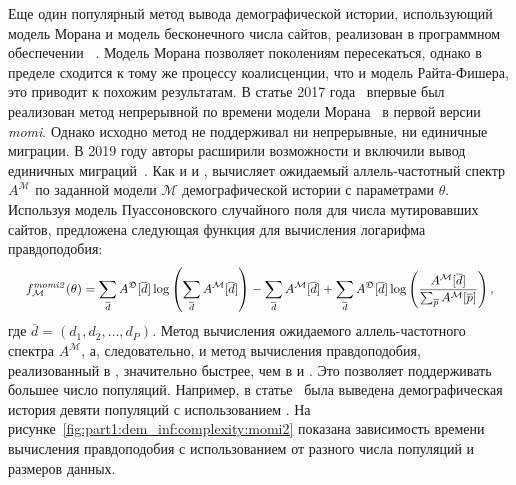 Еще один популярный метод вывода демографической истории, использующий модель Морана и модель бесконечного числа сайтов, реализован в программном обеспечении \momi~\cite{kamm2020efficiently}.
Модель Морана позволяет поколениям пересекаться, однако в пределе сходится к тому же процессу коалисценции, что и модель Райта-Фишера, это приводит к похожим результатам.
В статье 2017 года~\cite{kamm2017efficient} впервые был реализован метод непрерывной по времени модели Морана~\cite{durrett2008probability} в первой версии \textit{momi}.
Однако исходно метод не поддерживал ни непрерывные, ни единичные миграции.
В 2019 году авторы расширили возможности и включили вывод единичных миграций~\cite{kamm2020efficiently}.
Как и \dadi и \moments, \momi вычисляет ожидаемый аллель-частотный спектр $A^\mathcal{M}$ по заданной модели $\mathcal{M}$ демографической истории с параметрами $\theta$.
Используя модель Пуассоновского случайного поля для числа мутировавших сайтов, предложена следующая функция для вычисления логарифма правдоподобия:
$$
\scalemath{0.9}{
f^{\text{\momi}}_\mathcal{M}(\theta) = \sum_{\overline{d}} A^\mathfrak{D}[\overline{d}] \log \left(\sum_{\overline{d}} A^{\mathcal{M}}[\overline{d}]\right) - \sum_{\overline{d}} A^{\mathcal{M}}[\overline{d}] + \sum_{\overline{d}} A^{\mathfrak{D}}[\overline{d}] \log \left(\frac{A^{\mathcal{M}}[\overline{d}]}{\sum_{\overline{p}} A^{\mathcal{M}}[\overline{p}]}\right),
}
$$
где $\overline{d} = (d_1, d_2, \dots, d_P)$.
Метод вычисления ожидаемого аллель-частотного спектра $A^\mathcal{M}$, а, следовательно, и метод вычисления правдоподобия, реализованный в \momi, значительно быстрее, чем в \dadi и \moments.
Это позволяет поддерживать большее число популяций.
Например, в статье~\cite{kamm2020efficiently} была выведена демографическая история девяти популяций с использованием \momi.
На рисунке~\ref{fig:part1:dem_inf:complexity:momi2} показана зависимость времени вычисления правдоподобия с использованием \momi от разного числа популяций и размеров данных.


